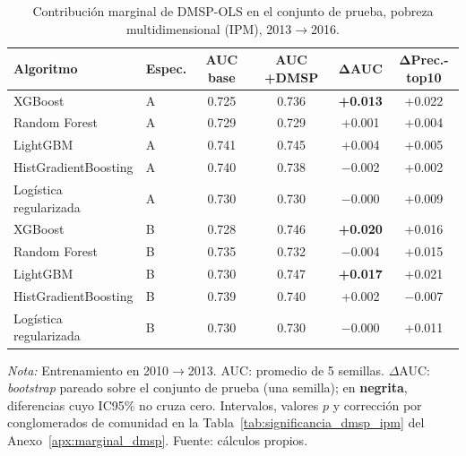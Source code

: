 \begin{table}[H]
  \centering
  \caption{Contribución marginal de DMSP-OLS en el conjunto de prueba,
  pobreza multidimensional (IPM), 2013$\to$2016.}
  \label{tab:marginal_dmsp_ipm_significancia}
  \footnotesize
  \setlength{\tabcolsep}{6pt}
  \begin{tabular}{llcccc}
    \toprule
    \textbf{Algoritmo} & \textbf{Espec.} & \textbf{AUC base} & \textbf{AUC +DMSP} & $\boldsymbol{\Delta}$\textbf{AUC} & $\boldsymbol{\Delta}$\textbf{Prec.-top10} \\
    \midrule
    XGBoost                  & A & 0.725 & 0.736 & \textbf{+0.013} & +0.022 \\
    Random Forest            & A & 0.729 & 0.729 & +0.001 & +0.004 \\
    LightGBM                 & A & 0.741 & 0.745 & +0.004 & +0.005 \\
    HistGradientBoosting     & A & 0.740 & 0.738 & $-$0.002 & +0.002 \\
    Logística regularizada   & A & 0.730 & 0.730 & $-$0.000 & +0.009 \\
    \addlinespace
    XGBoost                  & B & 0.728 & 0.746 & \textbf{+0.020} & +0.016 \\
    Random Forest            & B & 0.735 & 0.732 & $-$0.004 & +0.015 \\
    LightGBM                 & B & 0.730 & 0.747 & \textbf{+0.017} & +0.021 \\
    HistGradientBoosting     & B & 0.739 & 0.740 & +0.002 & $-$0.007 \\
    Logística regularizada   & B & 0.730 & 0.730 & $-$0.000 & +0.011 \\
    \bottomrule
  \end{tabular}
  \begin{minipage}{0.95\textwidth}
    \vspace{4pt}
    \footnotesize \textit{Nota:} Entrenamiento en 2010$\to$2013. AUC: promedio de 5 semillas.
    $\Delta$AUC: \emph{bootstrap} pareado sobre el conjunto de prueba
    (una semilla); en \textbf{negrita}, diferencias cuyo IC95\% no
    cruza cero. Intervalos, valores $p$ y corrección por
    conglomerados de comunidad en la
    Tabla~\ref{tab:significancia_dmsp_ipm} del
    Anexo~\ref{apx:marginal_dmsp}. Fuente: cálculos propios.
  \end{minipage}
\end{table}